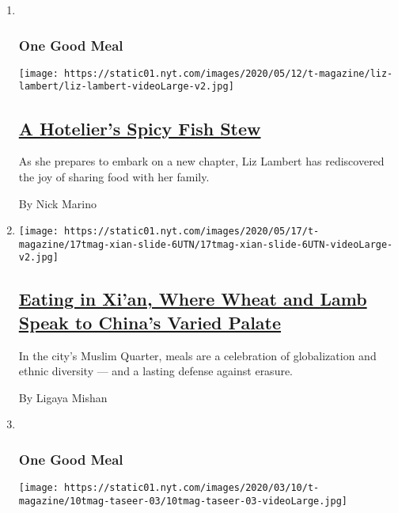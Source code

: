 \begin{enumerate}
\def\labelenumi{\arabic{enumi}.}
\item ~
  \hypertarget{one-good-meal-1}{%
  \subsubsection{One Good Meal}\label{one-good-meal-1}}

  \texttt{[image: https://static01.nyt.com/images/2020/05/12/t-magazine/liz-lambert/liz-lambert-videoLarge-v2.jpg]}

  \hypertarget{a-hoteliers-spicy-fish-stew}{%
  \subsection{\texorpdfstring{\href{/2020/05/18/t-magazine/liz-lambert-bouillabaisse-recipe.html}{A
  Hotelier's Spicy Fish
  Stew}}{A Hotelier's Spicy Fish Stew}}\label{a-hoteliers-spicy-fish-stew}}

  As she prepares to embark on a new chapter, Liz Lambert has
  rediscovered the joy of sharing food with her family.

  By Nick Marino
\item
  \texttt{[image: https://static01.nyt.com/images/2020/05/17/t-magazine/17tmag-xian-slide-6UTN/17tmag-xian-slide-6UTN-videoLarge-v2.jpg]}

  \hypertarget{eating-in-xian-where-wheat-and-lamb-speak-to-chinas-varied-palate}{%
  \subsection{\texorpdfstring{\href{/2020/05/11/t-magazine/xian-china-food.html}{Eating
  in Xi'an, Where Wheat and Lamb Speak to China's Varied
  Palate}}{Eating in Xi'an, Where Wheat and Lamb Speak to China's Varied Palate}}\label{eating-in-xian-where-wheat-and-lamb-speak-to-chinas-varied-palate}}

  In the city's Muslim Quarter, meals are a celebration of globalization
  and ethnic diversity --- and a lasting defense against erasure.

  By Ligaya Mishan
\item ~
  \hypertarget{one-good-meal-2}{%
  \subsubsection{One Good Meal}\label{one-good-meal-2}}

  \texttt{[image: https://static01.nyt.com/images/2020/03/10/t-magazine/10tmag-taseer-03/10tmag-taseer-03-videoLarge.jpg]}


\end{enumerate}
